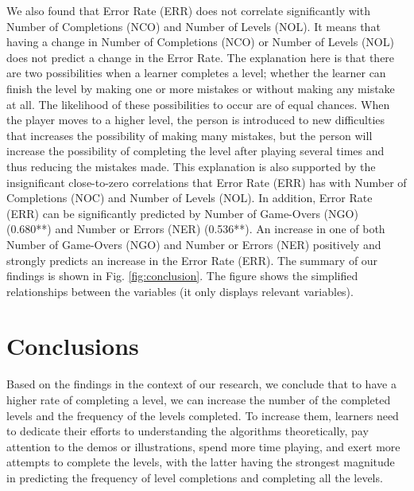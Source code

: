 \documentclass[conference]{IEEEtran}
\begin{document}
We also found that Error Rate (ERR) does not correlate significantly with Number of Completions (NCO) and Number of Levels (NOL). It means that having a change in Number of Completions (NCO) or Number of Levels (NOL) does not predict a change in the Error Rate. The explanation here is that there are two possibilities when a learner completes a level; whether the learner can finish the level by making one or more mistakes or without making any mistake at all. The likelihood of these possibilities to occur are of equal chances. When the player moves to a higher level, the person is introduced to new difficulties that increases the possibility of making many mistakes, but the person will increase the possibility of completing the level after playing several times and thus reducing the mistakes made. This explanation is also supported by the insignificant close-to-zero correlations that Error Rate (ERR) has with Number of Completions (NOC) and Number of Levels (NOL). In addition, Error Rate (ERR) can be significantly predicted by Number of Game-Overs (NGO) (0.680**) and Number or Errors (NER) (0.536**). An increase in one of both Number of Game-Overs (NGO) and Number or Errors (NER) positively and strongly predicts an increase in the Error Rate (ERR).  The summary of our findings is shown in  Fig. \ref{fig:conclusion}. The figure shows the simplified relationships between the variables (it only displays relevant variables).


\section{Conclusions}
\label{sec:conclusions}

Based on the findings in the context of our research, we conclude that to have a higher rate of completing a level, we can increase the number of the completed levels and the frequency of the levels completed. To increase them, learners need to dedicate their efforts to understanding the algorithms theoretically, pay attention to the demos or illustrations, spend more time playing, and exert more attempts to complete the levels, with the latter having the strongest magnitude in predicting the frequency of level completions and completing all the levels. 
\end{document}
